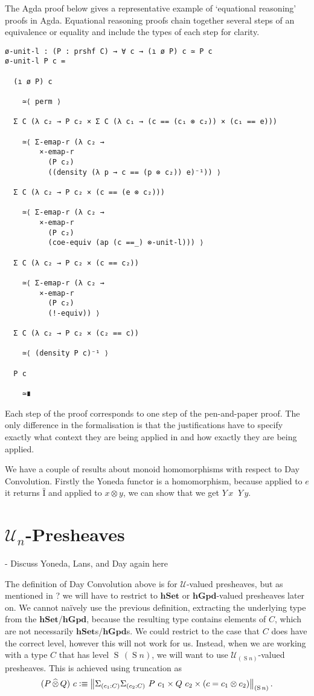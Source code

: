 \documentclass[12pt, parskip, DIV=14]{scrbook}
\newcommand{\defeq}{\vcentcolon\equiv}
\newcommand{\Suc}{\operatorname{S}}
\newcommand{\hSet}{\mathbf{hSet}}
\newcommand{\hGpd}{\mathbf{hGpd}}
\DeclareMathOperator\daytensor{\widehat\otimes}
\newcommand{\dayid}{\operatorname{\hat{I}}}
\begin{document}
The Agda proof below gives a representative example of `equational reasoning' proofs in Agda. Equational reasoning proofs chain together several steps of an equivalence or equality and include the types of each step for clarity.

\begin{verbatim}
ø-unit-l : (P : prshf C) → ∀ c → (ı ø P) c ≃ P c
ø-unit-l P c =

  (ı ø P) c

    ≃⟨ perm ⟩

  Σ C (λ c₂ → P c₂ × Σ C (λ c₁ → (c == (c₁ ⊗ c₂)) × (c₁ == e)))

    ≃⟨ Σ-emap-r (λ c₂ →
        ×-emap-r
          (P c₂)
          ((density (λ p → c == (p ⊗ c₂)) e)⁻¹)) ⟩

  Σ C (λ c₂ → P c₂ × (c == (e ⊗ c₂)))

    ≃⟨ Σ-emap-r (λ c₂ →
        ×-emap-r
          (P c₂)
          (coe-equiv (ap (c ==_) ⊗-unit-l))) ⟩

  Σ C (λ c₂ → P c₂ × (c == c₂))

    ≃⟨ Σ-emap-r (λ c₂ →
        ×-emap-r
          (P c₂)
          (!-equiv)) ⟩

  Σ C (λ c₂ → P c₂ × (c₂ == c))

    ≃⟨ (density P c)⁻¹ ⟩

  P c

    ≃∎
\end{verbatim}

Each step of the proof corresponds to one step of the pen-and-paper proof. The only difference in the formalisation is that the justifications have to specify exactly what context they are being applied in and how exactly they are being applied.

We have a couple of results about monoid homomorphisms with respect to Day Convolution. Firstly the Yoneda functor is a homomorphism, because applied to $e$ it returns $\dayid$ and applied to $x \otimes y$, we can show that we get $Y\,x \daytensor Y\,y$.

\section{$\mathcal{U}_n$-Presheaves}

- Discuss Yoneda, Lans, and Day again here

The definition of Day Convolution above is for $\mathcal{U}$-valued presheaves, but as mentioned in ? we will have to restrict to $\hSet$ or $\hGpd$-valued presheaves later on. We cannot na\"ively use the previous definition, extracting the underlying type from the $\hSet$/$\hGpd$, because the resulting type contains elements of $C$, which are not necessarily $\hSet$s/$\hGpd$s. We could restrict to the case that $C$ does have the correct level, however this will not work for us. Instead, when we are working with a type $C$ that has level $\Suc\,(\Suc n)$, we will want to use $\mathcal{U}_{(\Suc n)}$-valued presheaves. This is achieved using truncation as
$$(P \daytensor Q)~c \defeq \left\| \Sigma_{(c_1 : C)}\Sigma_{(c_2 : C)}~P~c_1 \times Q~c_2 \times (c = c_1 \otimes c_2)\right\|_{(\Suc n)}.$$
\end{document}
